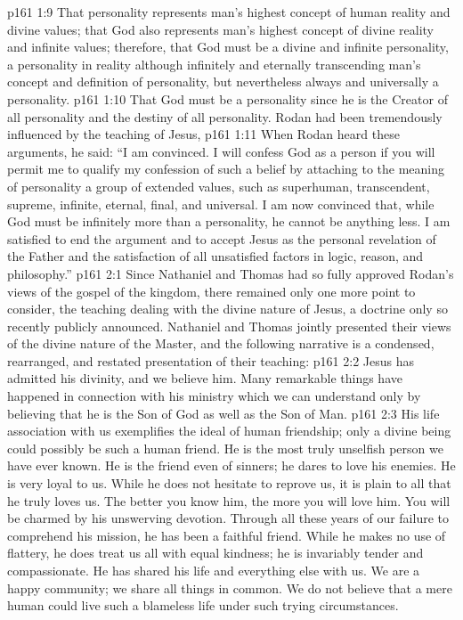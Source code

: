 \vs p161 1:9 \bibnobreakspace That personality represents man’s highest concept of human reality and divine values; that God also represents man’s highest concept of divine reality and infinite values; therefore, that God must be a divine and infinite personality, a personality in reality although infinitely and eternally transcending man’s concept and definition of personality, but nevertheless always and universally a personality.
\vs p161 1:10 \bibnobreakspace That God must be a personality since he is the Creator of all personality and the destiny of all personality. Rodan had been tremendously influenced by the teaching of Jesus, 
\vs p161 1:11 \pc When Rodan heard these arguments, he said: “I am convinced. I will confess God as a person if you will permit me to qualify my confession of such a belief by attaching to the meaning of personality a group of extended values, such as superhuman, transcendent, supreme, infinite, eternal, final, and universal. I am now convinced that, while God must be infinitely more than a personality, he cannot be anything less. I am satisfied to end the argument and to accept Jesus as the personal revelation of the Father and the satisfaction of all unsatisfied factors in logic, reason, and philosophy.”
\vs p161 2:1 Since Nathaniel and Thomas had so fully approved Rodan’s views of the gospel of the kingdom, there remained only one more point to consider, the teaching dealing with the divine nature of Jesus, a doctrine only so recently publicly announced. Nathaniel and Thomas jointly presented their views of the divine nature of the Master, and the following narrative is a condensed, rearranged, and restated presentation of their teaching:
\vs p161 2:2 \bibnobreakspace Jesus has admitted his divinity, and we believe him. Many remarkable things have happened in connection with his ministry which we can understand only by believing that he is the Son of God as well as the Son of Man.
\vs p161 2:3 \bibnobreakspace His life association with us exemplifies the ideal of human friendship; only a divine being could possibly be such a human friend. He is the most truly unselfish person we have ever known. He is the friend even of sinners; he dares to love his enemies. He is very loyal to us. While he does not hesitate to reprove us, it is plain to all that he truly loves us. The better you know him, the more you will love him. You will be charmed by his unswerving devotion. Through all these years of our failure to comprehend his mission, he has been a faithful friend. While he makes no use of flattery, he does treat us all with equal kindness; he is invariably tender and compassionate. He has shared his life and everything else with us. We are a happy community; we share all things in common. We do not believe that a mere human could live such a blameless life under such trying circumstances.
